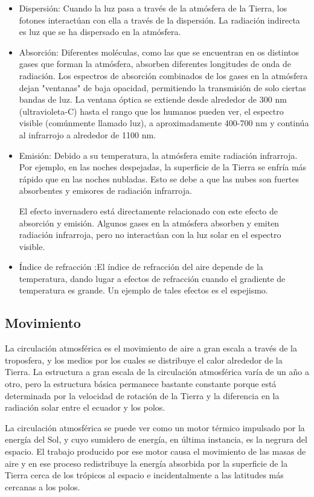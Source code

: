 \documentclass{article} %
\begin{document}
\begin{itemize}
\item Dispersión: 
Cuando la luz pasa a través de la atmósfera de la Tierra, los fotones interactúan con ella a través de la dispersión. La radiación indirecta es luz que se ha dispersado en la atmósfera.
\item Absorción: 
Diferentes moléculas, como las que se encuentran en os distintos gases que forman la atmósfera, absorben diferentes longitudes de onda de radiación. Los espectros de absorción combinados de los gases en la atmósfera dejan "ventanas" de baja opacidad, permitiendo la transmisión de solo ciertas bandas de luz. La ventana óptica se extiende desde alrededor de 300 nm (ultravioleta-C) hasta el rango que los humanos pueden ver, el espectro visible (comúnmente llamado luz), a aproximadamente 400-700 nm y continúa al infrarrojo a alrededor de 1100 nm.
\item Emisión: Debido a su temperatura, la atmósfera emite radiación infrarroja. Por ejemplo, en las noches despejadas, la superficie de la Tierra se enfría más rápido que en las noches nubladas. Esto se debe a que las nubes  son fuertes absorbentes y emisores de radiación infrarroja.

El efecto invernadero está directamente relacionado con este efecto de absorción y emisión. Algunos gases en la atmósfera absorben y emiten radiación infrarroja, pero no interactúan con la luz solar en el espectro visible.
\item Índice de refracción :El índice de refracción del aire depende de la temperatura, dando lugar a efectos de refracción cuando el gradiente de temperatura es grande. Un ejemplo de tales efectos es el espejismo.
\end{itemize}

\subsection{Movimiento}
La circulación atmosférica es el movimiento de aire a gran escala a través de la troposfera, y los medios por los cuales se distribuye el calor alrededor de la Tierra. La estructura a gran escala de la circulación atmosférica varía de un año a otro, pero la estructura básica permanece bastante constante porque está determinada por la velocidad de rotación de la Tierra y la diferencia en la radiación solar entre el ecuador y los polos.

La circulación atmosférica se puede ver como un motor térmico impulsado por la energía del Sol, y cuyo sumidero de energía, en última instancia, es la negrura del espacio. El trabajo producido por ese motor causa el movimiento de las masas de aire y en ese proceso redistribuye la energía absorbida por la superficie de la Tierra cerca de los trópicos al espacio e incidentalmente a las latitudes más cercanas a los polos.
\end{document}

